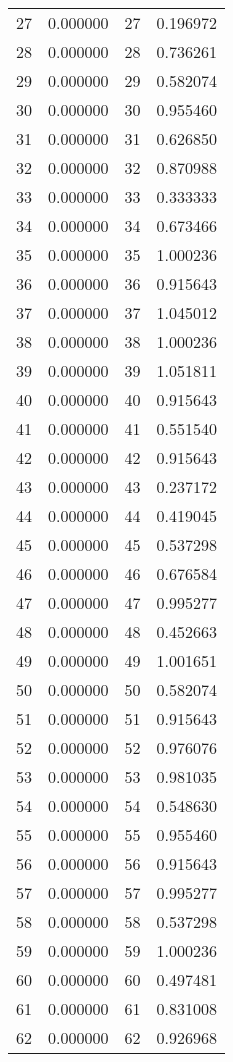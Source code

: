 \documentclass[12pt]{article}
\begin{document}
\begin{longtable}{@{}cccc@{}}
27 & 0.000000 & 27 & 0.196972 \\
28 & 0.000000 & 28 & 0.736261 \\
29 & 0.000000 & 29 & 0.582074 \\
30 & 0.000000 & 30 & 0.955460 \\
31 & 0.000000 & 31 & 0.626850 \\
32 & 0.000000 & 32 & 0.870988 \\
33 & 0.000000 & 33 & 0.333333 \\
34 & 0.000000 & 34 & 0.673466 \\
35 & 0.000000 & 35 & 1.000236 \\
36 & 0.000000 & 36 & 0.915643 \\
37 & 0.000000 & 37 & 1.045012 \\
38 & 0.000000 & 38 & 1.000236 \\
39 & 0.000000 & 39 & 1.051811 \\
40 & 0.000000 & 40 & 0.915643 \\
41 & 0.000000 & 41 & 0.551540 \\
42 & 0.000000 & 42 & 0.915643 \\
43 & 0.000000 & 43 & 0.237172 \\
44 & 0.000000 & 44 & 0.419045 \\
45 & 0.000000 & 45 & 0.537298 \\
46 & 0.000000 & 46 & 0.676584 \\
47 & 0.000000 & 47 & 0.995277 \\
48 & 0.000000 & 48 & 0.452663 \\
49 & 0.000000 & 49 & 1.001651 \\
50 & 0.000000 & 50 & 0.582074 \\
51 & 0.000000 & 51 & 0.915643 \\
52 & 0.000000 & 52 & 0.976076 \\
53 & 0.000000 & 53 & 0.981035 \\
54 & 0.000000 & 54 & 0.548630 \\
55 & 0.000000 & 55 & 0.955460 \\
56 & 0.000000 & 56 & 0.915643 \\
57 & 0.000000 & 57 & 0.995277 \\
58 & 0.000000 & 58 & 0.537298 \\
59 & 0.000000 & 59 & 1.000236 \\
60 & 0.000000 & 60 & 0.497481 \\
61 & 0.000000 & 61 & 0.831008 \\
62 & 0.000000 & 62 & 0.926968 \\

\end{longtable}
\end{document}
